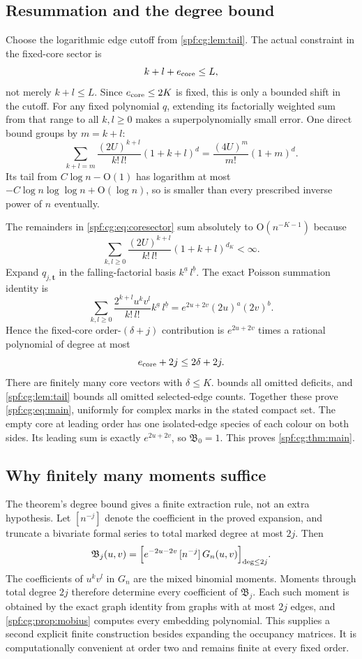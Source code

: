 \documentclass[11pt]{article}
\numberwithin{equation}{section}
\theoremstyle{definition}
\theoremstyle{remark}
\theoremstyle{definition}
\newcommand{\fall}[2]{{#1}^{\underline{#2}}}
\newcommand{\bigO}{\mathrm O}
\begin{document}
\subsection{Resummation and the degree bound}
Choose the logarithmic edge cutoff from \cref{spf:cg:lem:tail}. The actual
constraint in the fixed-core sector is
\[
 k+l+e_{\rm core}\le L,
\]
not merely $k+l\le L$. Since $e_{\rm core}\le2K$ is fixed, this is only a
bounded shift in the cutoff. For any fixed polynomial $q$, extending its
factorially weighted sum from that range to all $k,l\ge0$ makes a
superpolynomially small error. One direct bound groups by $m=k+l$:
\[
 \sum_{k+l=m}\frac{(2U)^{k+l}}{k!\,l!}(1+k+l)^d
       =\frac{(4U)^m}{m!}(1+m)^d.
\]
Its tail from $C\log n-\bigO(1)$ has logarithm at most
$-C\log n\log\log n+\bigO(\log n)$, so is smaller than every prescribed
inverse power of $n$ eventually.

The remainders in \eqref{spf:cg:eq:coresector} sum absolutely to
$\bigO(n^{-K-1})$ because
\[
 \sum_{k,l\ge0}\frac{(2U)^{k+l}}{k!\,l!}(1+k+l)^{d_K}<\infty.
\]
Expand $q_{j,\boldsymbol t}$ in the falling-factorial basis
$\fall ka\,\fall lb$. The exact Poisson summation identity is
\begin{equation}
 \sum_{k,l\ge0}\frac{2^{k+l}u^kv^l}{k!\,l!}\fall ka\,\fall lb
       =e^{2u+2v}(2u)^a(2v)^b.
 \label{spf:cg:eq:poissonsum}
\end{equation}
Hence the fixed-core order-$(\delta+j)$ contribution is $e^{2u+2v}$ times a
rational polynomial of degree at most
\[
 e_{\rm core}+2j\le2\delta+2j.
\]
There are finitely many core vectors with $\delta\le K$.
 bounds all omitted deficits, and
\cref{spf:cg:lem:tail} bounds all omitted selected-edge counts. Together
these prove \eqref{spf:cg:eq:main}, uniformly for complex marks in the stated
compact set. The empty core at leading order has one isolated-edge species
of each colour on both sides. Its leading sum is exactly $e^{2u+2v}$, so
$\mathfrak B_0=1$. This proves \cref{spf:cg:thm:main}.

\subsection{Why finitely many moments suffice}
The theorem's degree bound gives a finite extraction rule, not an extra
hypothesis. Let $[n^{-j}]$ denote the coefficient in the proved expansion,
and truncate a bivariate formal series to total marked degree at most $2j$.
Then
\begin{equation}
 \mathfrak B_j(u,v)=\Bigl[e^{-2u-2v}\,[n^{-j}]\,G_n(u,v)\Bigr]_{\deg\le2j}.
 \label{spf:cg:eq:finiteextract}
\end{equation}
The coefficients of $u^kv^l$ in $G_n$ are the mixed binomial moments.
Moments through total degree $2j$ therefore determine every coefficient of
$\mathfrak B_j$. Each such moment is obtained by the exact graph identity
from graphs with at most $2j$ edges, and \cref{spf:cg:prop:mobius} computes
every embedding polynomial. This supplies a second explicit finite
construction besides expanding the occupancy matrices. It is computationally
convenient at order two and remains finite at every fixed order.
\end{document}
